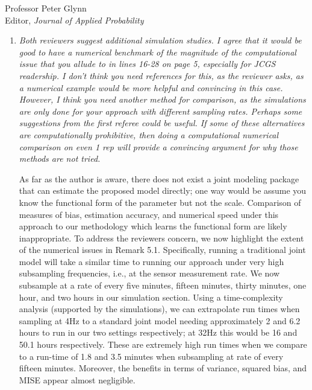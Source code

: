 \documentclass[11pt]{letter} %
\begin{document}
\begin{letter}{Professor
	Peter Glynn\\
	Editor, {\em Journal of Applied Probability}}
\begin{enumerate}
\vspace{5mm}
To accommodate the second referee's request without making the discussion too long, we have added Remark XX and XX that provide some intuition.  We have re-written the technical proofs to first provide a sketch proof (with intuition) and then a detailed proof.  We hope this helps the reader develop intuition on the first read while giving them some helpful guidance in order to facilitate understanding of the detailed theoretical analysis.
\vspace{5mm}

\item {\it Both reviewers suggest additional simulation studies. I agree that it would be good to have a numerical benchmark of the magnitude of the computational issue that you allude to in lines 16-28 on page 5, especially for JCGS readership. I don’t think you need references for this, as the reviewer asks, as a numerical example would be more helpful and convincing in this case. However, I think you need another method for comparison, as the simulations are only done for your approach with different sampling rates. Perhaps some suggestions from the first referee could be useful. If some of these alternatives are computationally prohibitive, then doing a computational numerical comparison on even 1 rep will provide a convincing argument for why those methods are not tried.}

\vspace{5mm}
As far as the author is aware, there does not exist a joint modeling package that can estimate the proposed model directly; one way would be assume you know the functional form of the parameter but not the scale.  Comparison of measures of bias, estimation accuracy, and numerical speed under this approach to our methodology which learns the functional form are likely inappropriate. To address the reviewers concern, we now highlight the extent of the numerical issues in Remark 5.1.  Specifically, running a traditional joint model will take a similar time to running our approach under very high subsampling frequencies, i.e., at the sensor measurement rate.  We now subsample at a rate of every five minutes, fifteen minutes, thirty minutes, one hour, and two hours in our simulation section.  Using a time-complexity analysis (supported by the simulations), we can extrapolate run times when sampling at 4Hz to a standard joint model needing approximately 2 and 6.2 hours to run in our two settings respectively; at 32Hz this would be 16 and 50.1 hours respectively. These are extremely high run times when we compare to a run-time of 1.8 and 3.5 minutes when subsampling at rate of every fifteen minutes.  Moreover, the benefits in terms of variance, squared bias, and MISE appear almost negligible.
\vspace{5mm}


\end{enumerate}
\end{letter}
\end{document}
